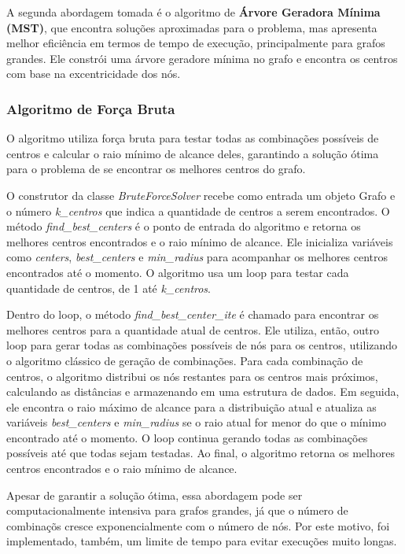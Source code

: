 A segunda abordagem tomada é o algoritmo de \textbf{Árvore Geradora Mínima (MST)}, que encontra soluções aproximadas para o problema, mas apresenta melhor eficiência em termos de tempo de execução, principalmente para grafos grandes. Ele constrói uma árvore geradore mínima no grafo e encontra os centros com base na excentricidade dos nós. 

\subsubsection{\esp Algoritmo de Força Bruta}
O algoritmo utiliza força bruta para testar todas as combinações possíveis de centros e calcular o raio mínimo de alcance deles, garantindo a solução ótima para o problema de se encontrar os melhores centros do grafo. 

O construtor da classe \textit{BruteForceSolver} recebe como entrada um objeto Grafo e o número \textit{k\_centros} que indica a quantidade de centros a serem encontrados. O método \textit{find\_best\_centers} é o ponto de entrada do algoritmo e retorna os melhores centros encontrados e o raio mínimo de alcance. Ele inicializa variáveis como \textit{centers}, \textit{best\_centers} e \textit{min\_radius} para acompanhar os melhores centros encontrados até o momento. O algoritmo usa um loop para testar cada quantidade de centros, de 1 até \textit{k\_centros}. 

Dentro do loop, o método \textit{find\_best\_center\_ite} é chamado para encontrar os melhores centros para a quantidade atual de centros. Ele utiliza, então, outro loop para gerar todas as combinações possíveis de nós para os centros, utilizando o algoritmo clássico de geração de combinações. Para cada combinação de centros, o algoritmo distribui os nós restantes para os centros mais próximos, calculando as distâncias e armazenando em uma estrutura de dados. Em seguida, ele encontra o raio máximo de alcance para a distribuição atual e atualiza as variáveis \textit{best\_centers} e \textit{min\_radius} se o raio atual for menor do que o mínimo encontrado até o momento. O loop continua gerando todas as combinações possíveis até que todas sejam testadas. Ao final, o algoritmo retorna os melhores centros encontrados  e o raio mínimo de alcance.

Apesar de garantir a solução ótima, essa abordagem pode ser computacionalmente intensiva para grafos grandes, já que o número de combinaçõs cresce exponencialmente com o número de nós. Por este motivo, foi implementado, também, um limite de tempo para evitar execuções muito longas. 


